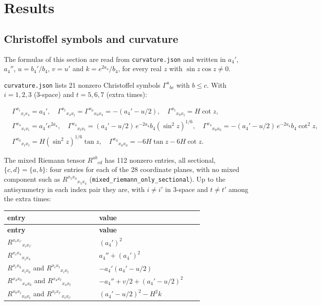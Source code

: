\documentclass[11pt]{article}
\begin{document}
\section{Results}

\subsection{Christoffel symbols and curvature}

The formulas of this section are read from \texttt{curvatur\allowbreak{}e.json} and written in $a_4'$, $a_4''$, $u = b_4'/b_4$, $v = u'$ and $k = e^{2a_4}/b_4$, for every real $z$ with $\sin z\cos z \neq 0$.

\texttt{curvatur\allowbreak{}e.json} lists 21 nonzero Christoffel symbols $\Gamma^a{}_{bc}$ with $b \le c$. With $i = 1, 2, 3$ (3-space) and $t = 5, 6, 7$ (extra times):

\[
\begin{aligned}
&\Gamma^{x_i}{}_{x_ix_4} = a_4',\quad \Gamma^{x_t}{}_{x_4x_t} = \Gamma^{x_0}{}_{x_0x_4} = -(a_4' - u/2),\quad \Gamma^{x_t}{}_{x_0x_t} = H\cot z,\\
&\Gamma^{x_4}{}_{x_ix_i} = a_4'e^{2a_4},\quad \Gamma^{x_4}{}_{x_tx_t} = (a_4' - u/2)\,e^{-2a_4}b_4(\sin^2z)^{1/6},\quad \Gamma^{x_4}{}_{x_0x_0} = -(a_4' - u/2)\,e^{-2a_4}b_4\cot^2z,\\
&\Gamma^{x_0}{}_{x_tx_t} = H(\sin^2z)^{1/6}\tan z,\quad \Gamma^{x_0}{}_{x_0x_0} = -6H\tan z - 6H\cot z .
\end{aligned}
\]

The mixed Riemann tensor $R^{ab}{}_{cd}$ has 112 nonzero entries, all sectional, $\{c, d\} = \{a, b\}$: four entries for each of the 28 coordinate planes, with no mixed component such as $R^{x_5x_0}{}_{x_5x_4}$ (\texttt{mixed\_ri\allowbreak{}emann\_on\allowbreak{}ly\_secti\allowbreak{}onal}). Up to the antisymmetry in each index pair they are, with $i \ne i'$ in 3-space and $t \ne t'$ among the extra times:

\begingroup
\small
\begin{longtable}{@{}>{\raggedright\arraybackslash}p{0.400\linewidth}>{\raggedright\arraybackslash}p{0.400\linewidth}@{}}
\toprule
\textbf{entry} & \textbf{value} \\
\midrule
\endfirsthead
\toprule
\textbf{entry} & \textbf{value} \\
\midrule
\endhead
$R^{x_ix_{i'}}{}_{x_ix_{i'}}$ & $(a_4')^2$ \\
$R^{x_ix_4}{}_{x_ix_4}$ & $a_4'' + (a_4')^2$ \\
$R^{x_ix_0}{}_{x_ix_0}$ and $R^{x_ix_t}{}_{x_ix_t}$ & $-a_4'(a_4' - u/2)$ \\
$R^{x_4x_0}{}_{x_4x_0}$ and $R^{x_4x_t}{}_{x_4x_t}$ & $-a_4'' + v/2 + (a_4' - u/2)^2$ \\
$R^{x_0x_t}{}_{x_0x_t}$ and $R^{x_tx_{t'}}{}_{x_tx_{t'}}$ & $(a_4' - u/2)^2 - H^2k$ \\
\bottomrule
\end{longtable}
\endgroup
\end{document}
